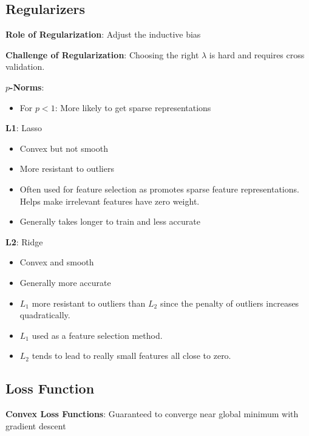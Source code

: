 \documentclass[10pt]{article}
\newcommand{\colortext}[2]{{\color{#1} #2}}
\newcommand{\red}[1]{\colortext{red}{#1}}
\begin{document}
\begin{multicols}{3}
  \subsection{Regularizers}

  \textbf{Role of Regularization}: \red{Adjust the inductive bias}

  \vspace{6pt}\textbf{Challenge of Regularization}: Choosing the right $\lambda$ is hard and requires cross validation.

  \textbf{$p$-Norms}:
  \begin{itemize}
    \item For $p<1$: More likely to get sparse representations
  \end{itemize}

  \textbf{L1}: Lasso
  \begin{itemize}
    \item Convex but not smooth
    \item More resistant to outliers
    \item Often used for feature selection as promotes sparse feature representations.  Helps make irrelevant features have zero weight.
    \item Generally takes longer to train and less accurate
  \end{itemize}

  \textbf{L2}: Ridge
  \begin{itemize}
    \item Convex and smooth
    \item Generally more accurate
  \end{itemize}

  \begin{itemize}
    \item $L_1$ more resistant to outliers than $L_2$ since the penalty of outliers increases quadratically.
    \item $L_1$ used as a feature selection method.
    \item $L_2$ tends to lead to really small features all close to zero.
  \end{itemize}

  \subsection{Loss Function}

  \textbf{Convex Loss Functions}: Guaranteed to converge near global minimum with gradient descent


\end{multicols}
\end{document}
